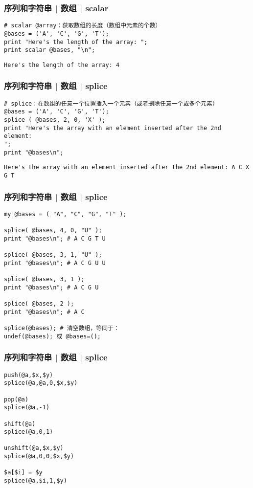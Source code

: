\begin{frame}[fragile]
  \frametitle{序列和字符串 | 数组 | \alert{scalar}}
\begin{lstlisting}
# scalar @array：获取数组的长度（数组中元素的个数）
@bases = ('A', 'C', 'G', 'T');
print "Here's the length of the array: ";
print scalar @bases, "\n";
\end{lstlisting}
\pause
\begin{lstlisting}
Here's the length of the array: 4
\end{lstlisting}
\end{frame}

\begin{frame}[fragile]
  \frametitle{序列和字符串 | 数组 | \alert{splice}}
\begin{lstlisting}
# splice：在数组的任意一个位置插入一个元素（或者删除任意一个或多个元素）
@bases = ('A', 'C', 'G', 'T');
splice ( @bases, 2, 0, 'X' );
print "Here's the array with an element inserted after the 2nd element:
";
print "@bases\n";
\end{lstlisting}
\pause
\begin{lstlisting}
Here's the array with an element inserted after the 2nd element: A C X G T
\end{lstlisting}
\end{frame}

\begin{frame}[fragile]
  \frametitle{序列和字符串 | 数组 | splice}
\begin{lstlisting}
my @bases = ( "A", "C", "G", "T" );

splice( @bases, 4, 0, "U" );
print "@bases\n"; # A C G T U

splice( @bases, 3, 1, "U" );
print "@bases\n"; # A C G U U

splice( @bases, 3, 1 );
print "@bases\n"; # A C G U

splice( @bases, 2 );
print "@bases\n"; # A C

splice(@bases); # 清空数组，等同于：
undef(@bases); 或 @bases=();
\end{lstlisting}
\end{frame}

\begin{frame}[fragile]
  \frametitle{序列和字符串 | 数组 | splice}
\begin{lstlisting}
push(@a,$x,$y)
splice(@a,@a,0,$x,$y)

pop(@a)
splice(@a,-1)

shift(@a)
splice(@a,0,1)

unshift(@a,$x,$y)
splice(@a,0,0,$x,$y)

$a[$i] = $y
splice(@a,$i,1,$y)
\end{lstlisting}
\end{frame}

